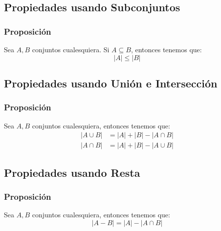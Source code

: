 \documentclass[12pt]{report}                                    %
\begin{document}
        \subsection{Propiedades usando Subconjuntos}
            
            \subsubsection{Proposición}
                Sea $A, B$ conjuntos cualesquiera. Si  $A \subseteq B$, entonces tenemos que:
                \begin{equation*}
                    |A| \leq |B|
                \end{equation*}


        \clearpage
        \subsection{Propiedades usando Unión e Intersección}
            
            \subsubsection{Proposición}
                Sea $A, B$ conjuntos cualesquiera, entonces tenemos que:
                \begin{equation*}
                \begin{split}
                    |A \cup B| &= |A| + |B| - |A \cap B|    \\  
                    |A \cap B| &= |A| + |B| - |A \cup B|  
                \end{split}
                \end{equation*}


        \clearpage
        \subsection{Propiedades usando Resta}

            \subsubsection{Proposición}
                Sea $A, B$ conjuntos cualesquiera, entonces tenemos que:
                \begin{equation*}
                    |A - B| = |A| - |A \cap B|
                \end{equation*}
\end{document}
